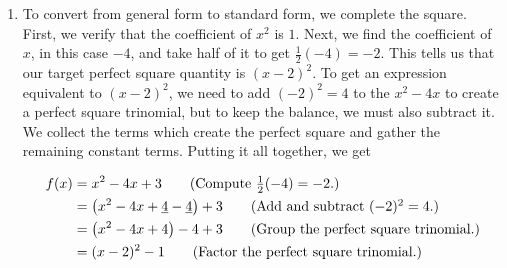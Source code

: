 \medskip


{
\begin{enumerate}

\item   To convert from general form to standard form, we complete the square. First, we verify that the coefficient of $x^2$ is $1$.  Next, we find the coefficient of $x$, in this case $-4$, and take half of it to get $\frac{1}{2}(-4) = -2$.  This tells us that our target perfect square quantity is $(x-2)^2$.  To get an expression equivalent to $(x-2)^2$, we need to add $(-2)^2 = 4$ to the $x^2-4x$ to create a perfect square trinomial, but to keep the balance, we must also subtract it.  We collect the terms which create the perfect square and gather the remaining constant terms. Putting it all together, we get 


\begin{align*}
f(x) & =  x^2-4x+3  \tag*{(Compute $\frac{1}{2} (-4) = -2$.)} \\
     & =  \left(x^2 - 4x + \underline{4}  - \underline{4}\right) + 3  \tag*{(Add and subtract $(-2)^2 = 4$.)}\\
          & =  \left(x^2 - 4x + 4\right)  - 4 + 3  \tag*{(Group the perfect square trinomial.)}\\
     & =  (x-2)^2 - 1  \tag*{(Factor the perfect square trinomial.)}
\end{align*}

\smallskip



\end{enumerate}}
